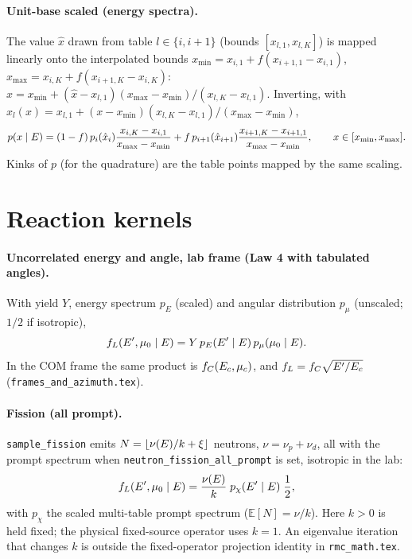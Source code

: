 \documentclass[11pt]{article}
\begin{document}
\paragraph{Unit-base scaled (energy spectra).} The value $\hat x$ drawn from table
$l \in \{i, i+1\}$ (bounds $[x_{l,1}, x_{l,K}]$) is mapped linearly onto the
interpolated bounds $x_{\min} = x_{i,1} + f(x_{i+1,1} - x_{i,1})$,
$x_{\max} = x_{i,K} + f(x_{i+1,K} - x_{i,K})$:
$x = x_{\min} + (\hat x - x_{l,1})(x_{\max} - x_{\min})/(x_{l,K} - x_{l,1})$. Inverting,
with $\hat x_l(x) = x_{l,1} + (x - x_{\min})(x_{l,K} - x_{l,1})/(x_{\max} - x_{\min})$,
\begin{equation}
  p(x \mid E) = (1-f)\,p_i(\hat x_i)\frac{x_{i,K}-x_{i,1}}{x_{\max}-x_{\min}}
  + f\,p_{i+1}(\hat x_{i+1})\frac{x_{i+1,K}-x_{i+1,1}}{x_{\max}-x_{\min}},
  \qquad x \in [x_{\min}, x_{\max}].
\end{equation}
Kinks of $p$ (for the quadrature) are the table points mapped by the same scaling.

\section{Reaction kernels}

\paragraph{Uncorrelated energy and angle, lab frame (Law 4 with tabulated angles).}
With yield $Y$, energy spectrum $p_E$ (scaled) and angular distribution $p_\mu$
(unscaled; $1/2$ if isotropic),
\begin{equation}
  f_L(E', \mu_0 \mid E) = Y\,p_E(E' \mid E)\,p_\mu(\mu_0 \mid E).
\end{equation}
In the COM frame the same product is $f_C(E_{c}, \mu_{c})$, and
$f_L = f_C\sqrt{E'/E_{c}}$ (\texttt{frames\_and\_azimuth.tex}).

\paragraph{Fission (all prompt).} \texttt{sample\_fission} emits
$N = \lfloor \nu(E)/k + \xi\rfloor$ neutrons, $\nu = \nu_p + \nu_d$, all with the prompt
spectrum when \texttt{neutron\_fission\_all\_prompt} is set, isotropic in the lab:
\begin{equation}
  f_L(E', \mu_0 \mid E) = \frac{\nu(E)}{k}\;p_\chi(E' \mid E)\;\frac{1}{2},
\end{equation}
with $p_\chi$ the scaled multi-table prompt spectrum ($\mathbb{E}[N] = \nu/k$).
Here $k>0$ is held fixed; the physical fixed-source operator uses $k=1$.
An eigenvalue iteration that changes $k$ is outside the fixed-operator projection
identity in \texttt{rmc\_math.tex}.
\end{document}
